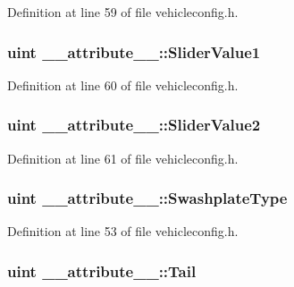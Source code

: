 Definition at line 59 of file vehicleconfig.\-h.

\hypertarget{group___config_plugin_gab1ae7499273b5e51087ce2da94c0acab}{
\subsubsection[{Slider\-Value1}]{\setlength{\rightskip}{0pt plus 5cm}uint \-\_\-\-\_\-attribute\-\_\-\-\_\-\-::\-Slider\-Value1}}\label{group___config_plugin_gab1ae7499273b5e51087ce2da94c0acab}


Definition at line 60 of file vehicleconfig.\-h.

\hypertarget{group___config_plugin_ga86cc56b0247155cf5d5ef0e31d509fed}{
\subsubsection[{Slider\-Value2}]{\setlength{\rightskip}{0pt plus 5cm}uint \-\_\-\-\_\-attribute\-\_\-\-\_\-\-::\-Slider\-Value2}}\label{group___config_plugin_ga86cc56b0247155cf5d5ef0e31d509fed}


Definition at line 61 of file vehicleconfig.\-h.

\hypertarget{group___config_plugin_ga4f96550cdd283e7bb8b8fb7ec7d3cc09}{
\subsubsection[{Swashplate\-Type}]{\setlength{\rightskip}{0pt plus 5cm}uint \-\_\-\-\_\-attribute\-\_\-\-\_\-\-::\-Swashplate\-Type}}\label{group___config_plugin_ga4f96550cdd283e7bb8b8fb7ec7d3cc09}


Definition at line 53 of file vehicleconfig.\-h.

\hypertarget{group___config_plugin_ga904a0b19b372c87ddf027435cd9e7723}{
\subsubsection[{Tail}]{\setlength{\rightskip}{0pt plus 5cm}uint \-\_\-\-\_\-attribute\-\_\-\-\_\-\-::\-Tail}}\label{group___config_plugin_ga904a0b19b372c87ddf027435cd9e7723}


